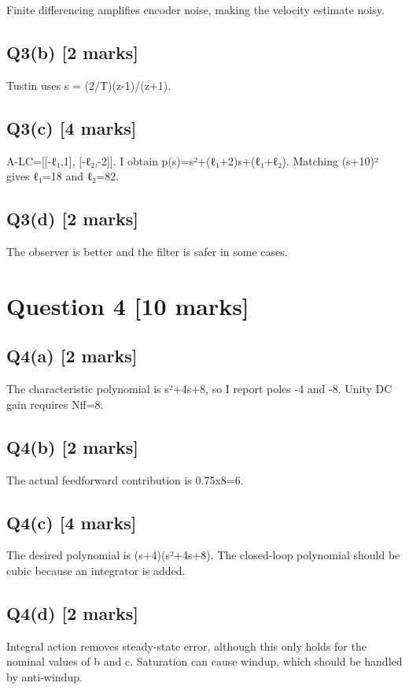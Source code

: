 \documentclass[11pt,a4paper]{article}
\begin{document}
Finite differencing amplifies encoder noise, making the velocity estimate noisy.

\subsection*{Q3(b) \hfill [2 marks]}

Tustin uses s = (2/T)(z-1)/(z+1).

\subsection*{Q3(c) \hfill [4 marks]}

A-LC=[[-ℓ₁,1], [-ℓ₂,-2]].
I obtain p(s)=s²+(ℓ₁+2)s+(ℓ₁+ℓ₂).
Matching (s+10)² gives ℓ₁=18 and ℓ₂=82.

\subsection*{Q3(d) \hfill [2 marks]}

The observer is better and the filter is safer in some cases.

\section*{Question 4 \hfill [10 marks]}
\subsection*{Q4(a) \hfill [2 marks]}

The characteristic polynomial is s²+4s+8, so I report poles -4 and -8.
Unity DC gain requires Nff=8.

\subsection*{Q4(b) \hfill [2 marks]}

The actual feedforward contribution is 0.75x8=6.

\subsection*{Q4(c) \hfill [4 marks]}

The desired polynomial is (s+4)(s²+4s+8).
The closed-loop polynomial should be cubic because an integrator is added.

\subsection*{Q4(d) \hfill [2 marks]}

Integral action removes steady-state error, although this only holds for the nominal values of b and c.
Saturation can cause windup, which should be handled by anti-windup.
\end{document}
